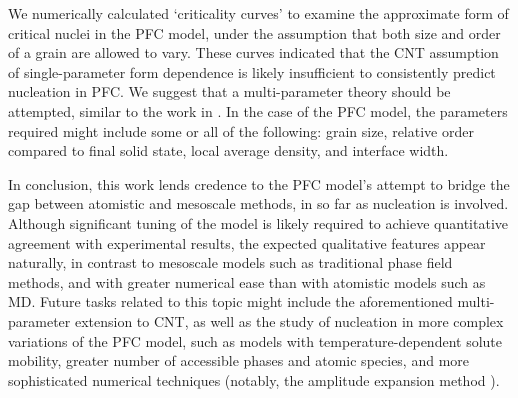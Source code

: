 We numerically calculated `criticality curves' to examine the approximate form of critical nuclei in the PFC model, under the assumption that both size and order of a grain are allowed to vary. These curves indicated that the CNT assumption of single-parameter form dependence is likely insufficient to consistently predict nucleation in PFC. We suggest that a multi-parameter theory should be attempted, similar to the work in \cite{lutsko15}. In the case of the PFC model, the parameters required might include some or all of the following: grain size, relative order compared to final solid state, local average density, and interface width.

In conclusion, this work lends credence to the PFC model's attempt to bridge the gap between atomistic and mesoscale methods, in so far as nucleation is involved. Although significant tuning of the model is likely required to achieve quantitative agreement with experimental results, the expected qualitative features appear naturally, in contrast to mesoscale models such as traditional phase field methods, and with greater numerical ease than with atomistic models such as MD. Future tasks related to this topic might include the aforementioned multi-parameter extension to CNT, as well as the study of nucleation in more complex variations of the PFC model, such as models with temperature-dependent solute mobility, greater number of accessible phases and atomic species, and more sophisticated numerical techniques (notably, the amplitude expansion method \cite{elder10,yeon10}).


%
%
%
%
%
%



